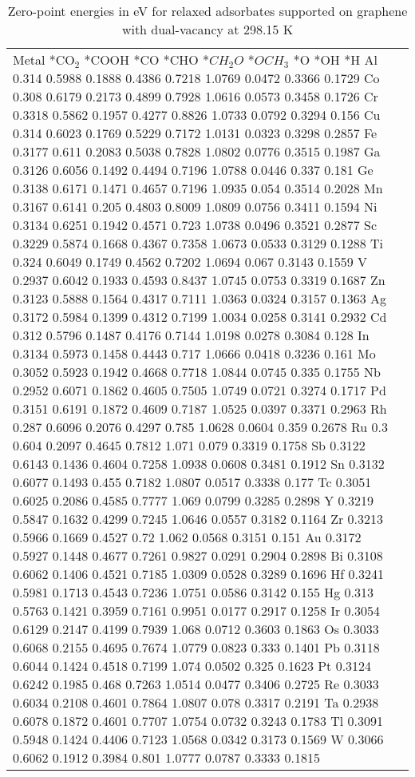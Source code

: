 \begin{table}[h]
    \centering
    \begin{tabular}{lr}
      \hline
      Metal	*CO$_2$	*COOH	*CO	*CHO	*$CH_2O$	*$OCH_3$	*O	*OH	*H
      \hline
      Al	0.314 	0.5988	0.1888	0.4386	0.7218	1.0769	0.0472	0.3366	0.1729
      Co	0.308	  0.6179	0.2173	0.4899	0.7928	1.0616	0.0573	0.3458	0.1726
      Cr	0.3318	0.5862	0.1957	0.4277	0.8826	1.0733	0.0792	0.3294	0.156
      Cu	0.314	  0.6023	0.1769	0.5229	0.7172	1.0131	0.0323	0.3298	0.2857
      Fe	0.3177	0.611 	0.2083	0.5038	0.7828	1.0802	0.0776	0.3515	0.1987
      Ga	0.3126	0.6056	0.1492	0.4494	0.7196	1.0788	0.0446	0.337 	0.181
      Ge	0.3138	0.6171	0.1471	0.4657	0.7196	1.0935	0.054	  0.3514	0.2028
      Mn	0.3167	0.6141	0.205 	0.4803	0.8009	1.0809	0.0756	0.3411	0.1594
      Ni	0.3134	0.6251	0.1942	0.4571	0.723 	1.0738	0.0496	0.3521	0.2877
      Sc	0.3229	0.5874	0.1668	0.4367	0.7358	1.0673	0.0533	0.3129	0.1288
      Ti	0.324 	0.6049	0.1749	0.4562	0.7202	1.0694	0.067	  0.3143	0.1559
      V	  0.2937  0.6042	0.1933	0.4593	0.8437	1.0745	0.0753	0.3319	0.1687
      Zn	0.3123	0.5888	0.1564	0.4317	0.7111	1.0363	0.0324	0.3157	0.1363
      Ag	0.3172	0.5984	0.1399	0.4312	0.7199	1.0034	0.0258	0.3141	0.2932
      Cd	0.312	  0.5796	0.1487	0.4176	0.7144	1.0198	0.0278	0.3084	0.128
      In	0.3134	0.5973	0.1458	0.4443	0.717	  1.0666	0.0418	0.3236	0.161
      Mo	0.3052	0.5923	0.1942	0.4668	0.7718	1.0844	0.0745	0.335	  0.1755
      Nb	0.2952	0.6071	0.1862	0.4605	0.7505	1.0749	0.0721	0.3274	0.1717
      Pd	0.3151	0.6191	0.1872	0.4609	0.7187	1.0525	0.0397	0.3371	0.2963
      Rh	0.287	  0.6096	0.2076	0.4297	0.785 	1.0628	0.0604	0.359	  0.2678
      Ru	0.3	  	0.604	  0.2097	0.4645	0.7812	1.071	  0.079	  0.3319	0.1758
      Sb	0.3122	0.6143	0.1436	0.4604	0.7258	1.0938	0.0608	0.3481	0.1912
      Sn	0.3132	0.6077	0.1493	0.455 	0.7182	1.0807	0.0517	0.3338	0.177
      Tc	0.3051	0.6025	0.2086	0.4585	0.7777	1.069 	0.0799	0.3285	0.2898
      Y	  0.3219	0.5847	0.1632	0.4299	0.7245	1.0646	0.0557	0.3182	0.1164
      Zr	0.3213	0.5966	0.1669	0.4527	0.72	  1.062	  0.0568	0.3151	0.151
      Au	0.3172	0.5927	0.1448	0.4677	0.7261	0.9827	0.0291	0.2904	0.2898
      Bi	0.3108	0.6062	0.1406	0.4521	0.7185	1.0309	0.0528	0.3289	0.1696
      Hf	0.3241	0.5981	0.1713	0.4543	0.7236	1.0751	0.0586	0.3142	0.155
      Hg	0.313	  0.5763	0.1421	0.3959	0.7161	0.9951	0.0177	0.2917	0.1258
      Ir	0.3054	0.6129	0.2147	0.4199	0.7939	1.068	  0.0712  0.3603	0.1863
      Os	0.3033	0.6068	0.2155	0.4695	0.7674	1.0779	0.0823	0.333 	0.1401
      Pb	0.3118	0.6044	0.1424	0.4518	0.7199	1.074	  0.0502  0.325	  0.1623
      Pt	0.3124	0.6242	0.1985	0.468	  0.7263	1.0514	0.0477	0.3406	0.2725
      Re	0.3033	0.6034	0.2108	0.4601	0.7864	1.0807	0.078 	0.3317	0.2191
      Ta	0.2938	0.6078	0.1872	0.4601	0.7707	1.0754	0.0732	0.3243	0.1783
      Tl	0.3091	0.5948	0.1424	0.4406	0.7123	1.0568	0.0342	0.3173	0.1569
      W	  0.3066	0.6062	0.1912	0.3984	0.801 	1.0777	0.0787	0.3333	0.1815
      \hline
    \end{tabular}
    \caption{Zero-point energies in eV for relaxed adsorbates supported on graphene with dual-vacancy at 298.15 K
    }
    \label{si_table11}
\end{table}


